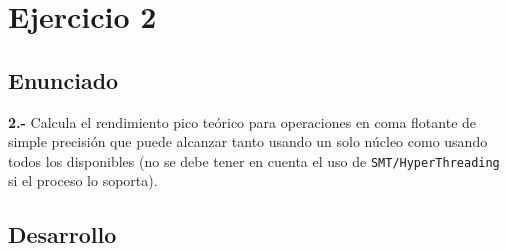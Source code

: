 \section{Ejercicio 2}
\subsection{Enunciado}
\begin{ejer}
    \textbf{2.-} Calcula el rendimiento pico teórico para operaciones en coma flotante de simple precisión
    que puede alcanzar tanto usando un solo núcleo como usando todos los disponibles (no se debe tener en cuenta
    el uso de \texttt{SMT/HyperThreading} si el proceso lo soporta).
\end{ejer}
\newpage
\subsection{Desarrollo}
